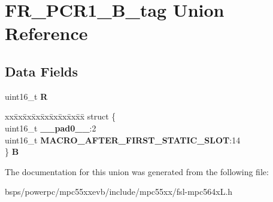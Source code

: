 \hypertarget{unionFR__PCR1__16B__tag}{}\section{F\+R\+\_\+\+P\+C\+R1\+\_\+B\+\_\+tag Union Reference}
\label{unionFR__PCR1__16B__tag}
\subsection*{Data Fields}
\begin{DoxyCompactItemize}
\item 
\mbox{\label{unionFR__PCR1__16B__tag_a383ed159849d368e3747c4dd3968eb5d}} 
uint16\+\_\+t {\bfseries R}
\item 
\mbox{\label{unionFR__PCR1__16B__tag_a608075d603da8e1180d4102293c1bce7}} 
\begin{tabbing}
xx\=xx\=xx\=xx\=xx\=xx\=xx\=xx\=xx\=\kill
struct \{\\
\>uint16\_t {\bfseries \_\_pad0\_\_}:2\\
\>uint16\_t {\bfseries MACRO\_AFTER\_FIRST\_STATIC\_SLOT}:14\\
\} {\bfseries B}\\

\end{tabbing}\end{DoxyCompactItemize}


The documentation for this union was generated from the following file\+:\begin{DoxyCompactItemize}
\item 
bsps/powerpc/mpc55xxevb/include/mpc55xx/fsl-\/mpc564x\+L.\+h\end{DoxyCompactItemize}
